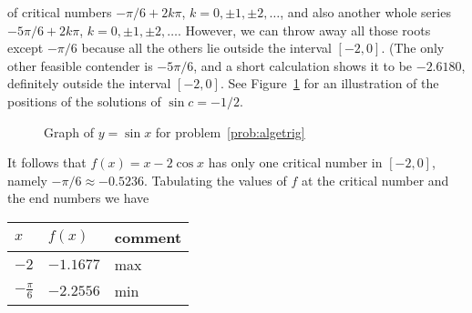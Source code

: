 \documentclass{article}
\begin{document}
\begin{enumerate}
\begin{enumerate}
    of critical numbers $-\pi/6+2k\pi$, $k=0,\pm 1, \pm 2,\ldots$, and also
    another whole series $-5\pi/6+2k\pi$, $k=0,\pm 1, \pm 2, \ldots$.
    However, we can throw away all those roots except $-\pi/6$ because all
    the others lie outside the interval $[-2,0]$.  (The only other feasible
    contender is $-5\pi/6$, and a short calculation shows it to be $-2.6180$,
    definitely outside the interval $[-2,0]$.  See Figure~\ref{fig:sine} for
    an illustration of the positions of the solutions of $\sin c=-1/2$.
    \begin{figure}[htbp]
      \centering
      \caption{Graph of $y=\sin x$ for problem~\ref{prob:algetrig}}
      \label{fig:sine}
    \end{figure}
    It follows that $f(x)=x-2\cos x$ has only one critical number in $[-2,0]$,
    namely $-\pi/6\approx -0.5236$.  Tabulating the values of $f$ at the
    critical number and the end numbers we have
    \begin{table}[htbp]
      \centering
      \begin{tabular}{|l|l|l|}
        \hline 
        $x$               & $f(x)$    & comment \\ \hline\hline
        $-2$              & $-1.1677$ & max     \\ \hline
        $-\frac{\pi}{6}$  & $-2.2556$ & min     \\ \hline

\end{tabular}
\end{table}
\end{enumerate}
\end{enumerate}
\end{document}
